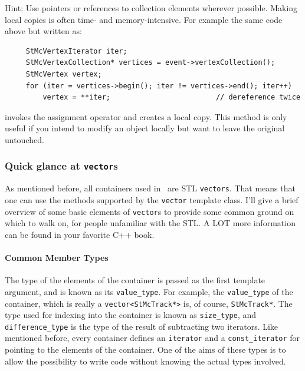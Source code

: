 Hint: Use pointers or references to collection elements wherever
possible.  Making local copies is often time- and memory-intensive.
For example the same code above but written as:
\begin{verbatim}
     StMcVertexIterator iter;
     StMcVertexCollection* vertices = event->vertexCollection();
     StMcVertex vertex;
     for (iter = vertices->begin(); iter != vertices->end(); iter++)
         vertex = **iter;                         // dereference twice
\end{verbatim}
invokes the  assignment operator and creates a local copy.
This method is only useful if you intend to modify an object locally
but want to leave the original untouched.

\subsubsection{Quick glance at {\tt vector}s}
\label{subsec:vectors}
As mentioned before, all containers used in \StMcEvent\ are STL {\tt vectors}.  That
means that one can use the methods supported by the {\tt vector}
template class.  I'll give a brief overview of some basic elements
of {\tt vector}s to provide some common ground on which to walk on, for
people unfamiliar with the STL.  A LOT more information can be found
in your favorite C++ book.

\paragraph{Common Member Types}
The type of the elements of the container is passed as the
first template argument, and is known as its {\tt value\_type}.  For
example, the {\tt value\_type} of the  container,
which is really a \verb+vector<StMcTrack*>+ is, of course, {\tt StMcTrack*}.
The type used for indexing into the container is known as {\tt size\_type},
and {\tt difference\_type} is the type of the result of subtracting
two iterators.  Like mentioned before, every container defines an
{\tt iterator} and a {\tt const\_iterator} for pointing to the elements
of the container.  One of the aims of these types is to allow the
possibility to write code without knowing the actual types involved.

